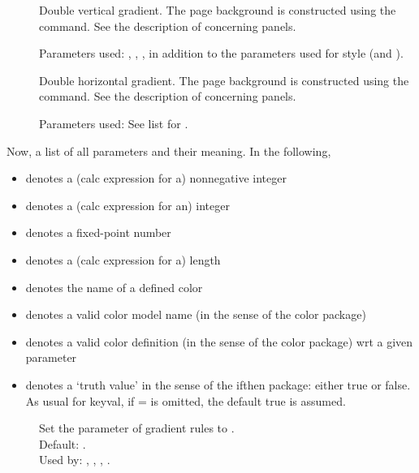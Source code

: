\begin{slide}
\begin{description}
  \item[]
    Double vertical gradient. The page background is constructed using the
     command. See the
    description of  concerning panels.

    \begin{flushleft}
    Parameters used: , ,
    ,  in addition to the parameters used for
    style  (and ).
    \end{flushleft}

  \item[]
    Double horizontal gradient. The page background is constructed using the
     command. See the description of
     concerning panels.

    Parameters used: See list for .

  \end{description}
  Now, a list of all parameters and their meaning. In the following,
  \begin{itemize}\setlength{\itemsep}{0cm}
  \item[\carg{n}]   denotes a (calc expression for a) nonnegative integer
  \item[\carg{i}]   denotes a (calc expression for an) integer
  \item[\carg{r}]   denotes a fixed-point number
  \item[\carg{l}]   denotes a (calc expression for a) length
  \item[\carg{c}]   denotes the name of a defined color
  \item[\carg{cm}]  denotes a valid color model name (in the sense of the color
    package)
  \item[\carg{cd}]  denotes a valid color definition (in the sense of the color
    package) wrt a given  parameter
  \item[\carg{t}]   denotes a `truth value' in the sense of the ifthen package:
    either true or false. As usual for keyval, if = is omitted, the
    default true is assumed.
  \end{itemize}
  \begin{description}
  \item[] Set the 
    parameter of gradient rules to .\\
    Default: . \\
    Used by: , , ,
    .


\end{description}
\end{slide}
